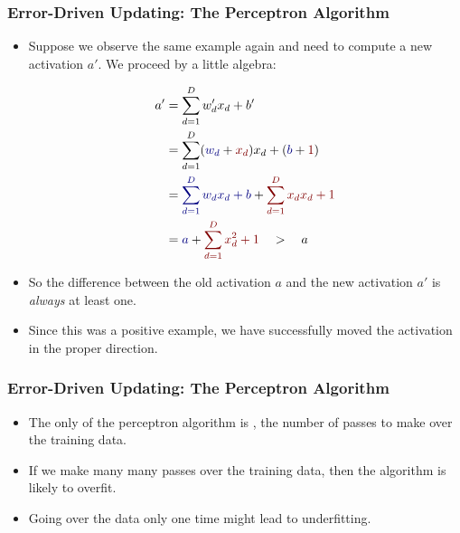 \documentclass[trans]{beamer}
\begin{document}
\begin{frame}
  \frametitle{Error-Driven Updating: The Perceptron Algorithm}
\begin{itemize}
\item Suppose we observe the same example again and need to compute a
new activation $a'$.  We proceed by a little algebra:
\begin{scriptsize}
\begin{align}
a'
&= \sum_{d=1}^D w'_d x_d + b' \\
&= \sum_{d=1}^D (\textcolor{darkblue}{w_d} + \textcolor{darkred}{x_d}) x_d + (\textcolor{darkblue}{b} + \textcolor{darkred}{1}) \\
&= \textcolor{darkblue}{\sum_{d=1}^D w_d x_d + b} + \textcolor{darkred}{\sum_{d=1}^D x_d x_d + 1} \\
&= \textcolor{darkblue}{a} + \textcolor{darkred}{\sum_{d=1}^D x_d^2 + 1}
\quad > \quad a
\end{align}
\end{scriptsize}
\item 
So the difference between the old activation $a$ and the new
activation $a'$ is \emph{always} at least one.
\item   Since this
was a positive example, we have successfully moved the activation in
the proper direction.
\end{itemize}
\end{frame}

\begin{frame}
  \frametitle{Error-Driven Updating: The Perceptron Algorithm}
\begin{itemize}
\item
The only  of the perceptron algorithm is
, the number of passes to make over the training data.
\item If we make many many passes over the training data, then the algorithm
is likely to overfit.
\item Going
over the data only one time might lead to underfitting.  
\end{itemize}

\end{frame}
\end{document}
